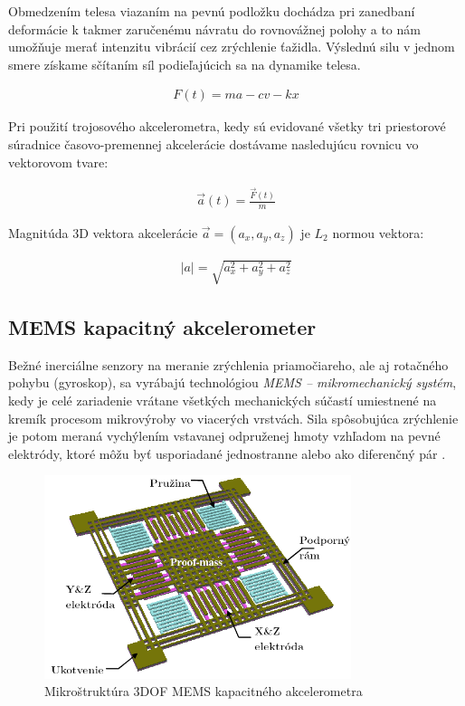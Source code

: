 Obmedzením telesa viazaním na pevnú podložku dochádza pri zanedbaní deformácie k takmer zaručenému návratu do rovnovážnej
polohy a to nám umožňuje merať intenzitu vibrácií cez zrýchlenie ťažidla. Výslednú silu v jednom smere získame sčítaním síl podieľajúcich sa na dynamike telesa.
\begin{ceqn}\begin{align}
 	F(t) = ma - cv - kx
\end{align}\end{ceqn}

Pri použití trojosového akcelerometra, kedy sú evidované všetky tri priestorové súradnice časovo-premennej akcelerácie dostávame
nasledujúcu rovnicu vo vektorovom tvare:
\begin{ceqn}\begin{align}
   \vec{a}(t) = \frac{\vec{F}(t)}{m}
\end{align}\end{ceqn}

Magnitúda 3D vektora akcelerácie $\vec{a} = (a_x, a_y, a_z)$ je $L_2$ normou vektora:
\begin{ceqn}\begin{align}
   |a| = \sqrt{a_x^2 + a_y^2 + a_z^2}
\end{align}\end{ceqn}

\subsection{MEMS kapacitný akcelerometer}
Bežné inerciálne senzory na meranie zrýchlenia priamočiareho, ale aj rotačného pohybu (gyroskop), sa vyrábajú technológiou
\emph{MEMS – mikromechanický systém}, kedy je celé zariadenie vrátane všetkých mechanických súčastí umiestnené na kremík procesom
mikrovýroby vo viacerých vrstvách. Sila spôsobujúca zrýchlenie je potom meraná vychýlením vstavanej odpruženej hmoty vzhľadom
na pevné elektródy, ktoré môžu byť usporiadané jednostranne alebo ako diferenčný pár \cite{mdof-mems-accelerometers}.

\begin{figure}[h]
	\centering
	\includegraphics[width=0.8\textwidth]{figures/analysis/mems-accelerometer.png}
	\caption{Mikroštruktúra 3DOF MEMS kapacitného akcelerometra \cite{microstructure-mems}}
	\label{fig:mems}
\end{figure}


